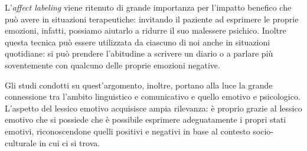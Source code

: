 L'\textit{affect labeling} viene ritenuto di grande importanza per l'impatto benefico che può avere in situazioni terapeutiche: invitando il paziente ad esprimere le proprie emozioni, infatti, possiamo aiutarlo a ridurre il suo malessere psichico. Inoltre questa tecnica può essere utilizzata da ciascuno di noi anche in situazioni quotidiane: si può prendere l'abitudine a scrivere un diario o a parlare più soventemente con qualcuno delle proprie emozioni negative.

Gli studi condotti su quest'argomento, inoltre, portano alla luce la grande connessione tra l'ambito linguistico e comunicativo e quello emotivo e psicologico.\\
L'aspetto del lessico emotivo acquisisce ampia rilevanza: è proprio grazie al lessico emotivo che si possiede che è possibile esprimere adeguatamente i propri stati emotivi, riconoscendone quelli positivi e negativi in base al contesto socio-culturale in cui ci si trova.